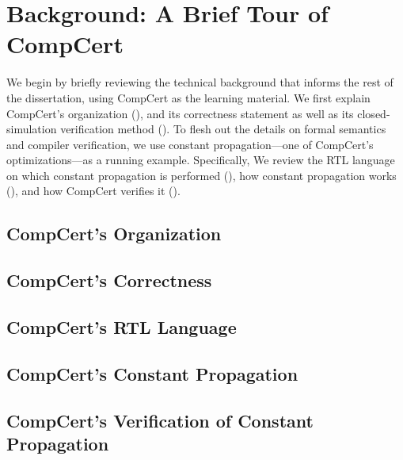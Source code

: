 \section{Background: A Brief Tour of CompCert}
\label{sec:background}

We begin by briefly reviewing the technical background that informs the rest of the dissertation,
using CompCert as the learning material.  We first explain CompCert's organization
(), and its correctness statement as well as its closed-simulation
verification method ().  To flesh out the details on formal
semantics and compiler verification, we use constant propagation---one of CompCert's
optimizations---as a running example.  Specifically, We review the RTL language on which constant
propagation is performed (), how constant propagation works
(), and how CompCert verifies it ().


\subsection{CompCert's Organization}
\label{sec:background:organization}

\subsection{CompCert's Correctness}
\label{sec:background:correctness}

\subsection{CompCert's RTL Language}
\label{sec:background:rtl}

\subsection{CompCert's Constant Propagation}
\label{sec:background:opt}

\subsection{CompCert's Verification of Constant Propagation}
\label{sec:background:verification}



